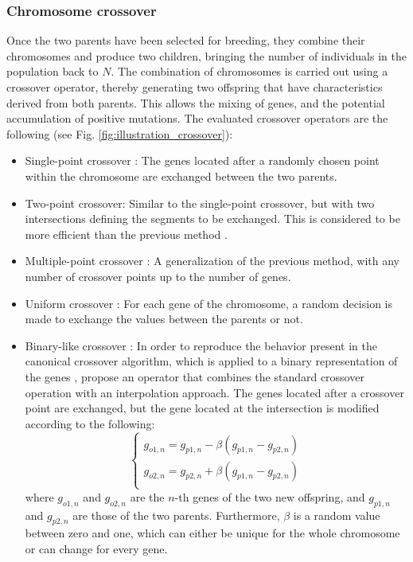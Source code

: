 \documentclass{ametsoc}
\begin{document}
\subsubsection{Chromosome crossover}
\label{sec:gas:crossover}

Once the two parents have been selected for breeding, they combine their chromosomes and produce two children, bringing the number of individuals in the population back to $N$. The combination of chromosomes is carried out using a crossover operator, thereby generating two offspring that have characteristics derived from both parents. This allows the mixing of genes, and the potential accumulation of positive mutations. The evaluated crossover operators are the following (see Fig. \ref{fig:illustration_crossover}):

\begin{itemize}
	\item Single-point crossover \citep{Goldberg1989}: The genes located after a randomly chosen point within the chromosome are exchanged between the two parents.
	
	\item Two-point crossover: Similar to the single-point crossover, but with two intersections defining the segments to be exchanged. This is considered to be more efficient than the previous method \citep{Beasley1993a}.
	
	\item Multiple-point crossover \citep{DeJong1975a}: A generalization of the previous method, with any number of crossover points up to the number of genes.
	
	\item Uniform crossover \citep{Syswerda1989}: For each gene of the chromosome, a random decision is made to exchange the values between the parents or not.
	
	\item Binary-like crossover \citep{Haupt2004}: In order to reproduce the behavior present in the canonical crossover algorithm, which is applied to a binary representation of the genes \citep{Goldberg1989, Goldberg1990a, Herrera1998a}, \citet{Haupt2004} propose an operator that combines the standard crossover operation with an interpolation approach. The genes located after a crossover point are exchanged, but the gene located at the intersection is modified according to the following:
	\begin{equation}
	\left\lbrace \begin{array}{l} 
	g_{o1,n} = g_{p1,n} - \beta (g_{p1,n} - g_{p2,n}) \\
	g_{o2,n} = g_{p2,n} + \beta (g_{p1,n} - g_{p2,n}) \\
	\end{array} \right.
	\label{eq:binary_like_crossover}
	\end{equation}
	where $g_{o1,n}$ and $g_{o2,n}$ are the $n$-th genes of the two new offspring, and $g_{p1,n}$ and $g_{p2,n}$ are those of the two parents. Furthermore, $\beta$ is a random value between zero and one, which can either be unique for the whole chromosome or can change for every gene.
	

\end{itemize}
\end{document}
